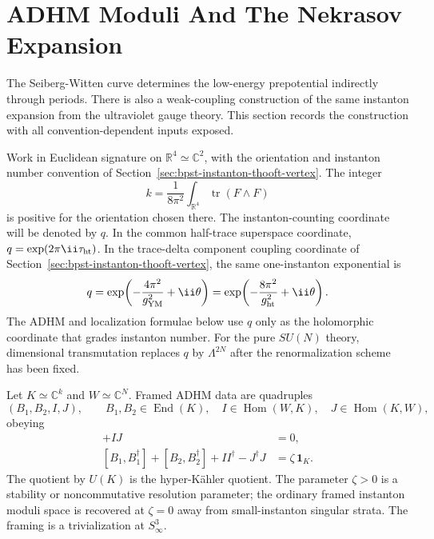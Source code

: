 \section{ADHM Moduli And The Nekrasov Expansion}
\label{sec:n2-adhm-nekrasov-expansion}

The Seiberg-Witten curve determines the low-energy prepotential indirectly
through periods.  There is also a weak-coupling construction of the same
instanton expansion from the ultraviolet gauge theory.  This section records
the construction with all convention-dependent inputs exposed.

Work in Euclidean signature on \(\mathbb R^4\simeq\mathbb C^2\), with the
orientation and instanton number convention of
Section~\ref{sec:bpst-instanton-thooft-vertex}.  The integer
\[
  k=\frac1{8\pi^2}\int_{\mathbb R^4}\operatorname{tr}(F\wedge F)
\]
is positive for the orientation chosen there.  The instanton-counting
coordinate will be denoted by \(q\).  In the common half-trace superspace
coordinate, \(q=\exp(2\pi\ii\tau_{\rm ht})\).  In the trace-delta component
coupling coordinate of Section~\ref{sec:bpst-instanton-thooft-vertex}, the
same one-instanton exponential is
\[
  q
  =
  \exp\!\left(
    -\frac{4\pi^2}{g_{\rm YM}^2}+\ii\theta
  \right)
  =
  \exp\!\left(
    -\frac{8\pi^2}{g_{\rm ht}^2}+\ii\theta
  \right).
\]
The ADHM and localization formulae below use \(q\) only as the holomorphic
coordinate that grades instanton number.  For the pure \(SU(N)\) theory,
dimensional transmutation replaces \(q\) by \(\Lambda^{2N}\) after the
renormalization scheme has been fixed.

\begin{definition}
\label{def:framed-adhm-data-un}
Let \(K\simeq\mathbb C^k\) and \(W\simeq\mathbb C^N\).  Framed ADHM data are
quadruples
\[
  (B_1,B_2,I,J),
  \qquad
  B_1,B_2\in\operatorname{End}(K),\quad
  I\in\operatorname{Hom}(W,K),\quad
  J\in\operatorname{Hom}(K,W),
\]
obeying
\begin{align}
  [B_1,B_2]+IJ&=0,
  \label{eq:adhm-complex-moment-map}\\
  [B_1,B_1^\dagger]+[B_2,B_2^\dagger]+II^\dagger-J^\dagger J
  &=\zeta\,\mathbf 1_K .
  \label{eq:adhm-real-moment-map}
\end{align}
The quotient by \(U(K)\) is the hyper-K\"ahler quotient.  The parameter
\(\zeta>0\) is a stability or noncommutative resolution parameter; the
ordinary framed instanton moduli space is recovered at \(\zeta=0\) away from
small-instanton singular strata.  The framing is a trivialization at
\(S^3_\infty\).
\end{definition}

